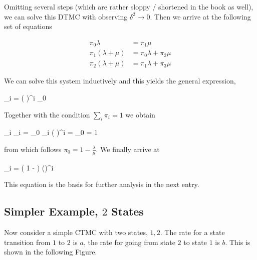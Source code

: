 Omitting several steps (which are rather sloppy / shortened in the book as well), we can solve this DTMC with observing $\delta^2 \rightarrow 0$. Then we arrive at the following set of equations

\begin{align*}
\pi_0 \lambda &= \pi_1 \mu \\
\pi_1(\lambda + \mu) &= \pi_0 \lambda + \pi_2 \mu \\
\pi_2(\lambda + \mu) &= \pi_1 \lambda + \pi_3 \mu
\end{align*}

We can solve this system inductively and this yields the general expression,

\bee
\pi_i = \left( \frac{\lambda}{\mu}\right)^i \pi_0
\eee

Together with the condition $\sum_i \pi_i = 1$ we obtain

\bee
\sum_i \pi_i = \pi_0 \sum_i \left( \frac{\lambda}{\mu} \right)^i = \pi_0  = 1
\eee

from which follows $\pi_0 = 1 - \frac{\lambda}{\mu}$. We finally arrive at

\bee
\pi_i = \left( 1 - \frac{\lambda}{\mu} \right) \left(\frac{\lambda}{\mu}\right)^i
\eee

This equation is the basis for further analysis in the next entry.


\subsection{Simpler Example, $2$ States}

Now consider a simple CTMC with two states, $1,2$. The rate for a state transition from $1$ to $2$ is $a$, the rate for going from state $2$ to state $1$ is $b$. This is shown in the following Figure.


\vspace*{7mm}



